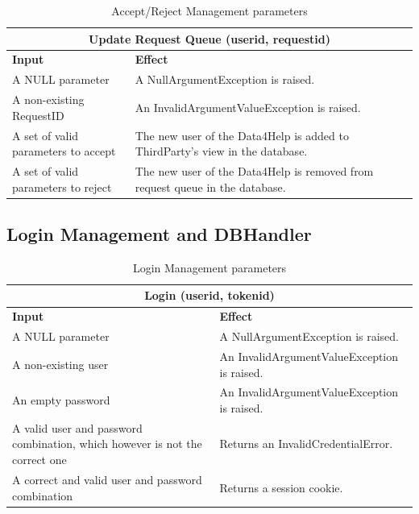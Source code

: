 \documentclass[a4paper, hidelinks, 12pt]{report}
\begin{document}
\begin{table}[H]
		\centering
		\begin{tabular}{|p{6cm}|p{9cm}|}
			\hline\hline
			\multicolumn{2}{c}{\textbf{Update Request Queue (userid, requestid)} }\\
			\hline
			\textbf{Input} & \textbf{Effect} \\ [0.5ex]
			\hline
			A NULL parameter & A NullArgumentException is raised.  \\
			\hline
			A non-existing RequestID & An InvalidArgumentValueException is raised.\\
			\hline
			A set of valid parameters to accept & The new user of the Data4Help is added to ThirdParty's view in the database.\\
			
			\hline
			A set of valid parameters to reject & The new user of the Data4Help is removed from request queue in the database.\\
			\hline
			
		\end{tabular}
		\caption{Accept/Reject Management parameters}
		\label{fig:Accept/Reject Management parameters}
	\end{table}
	
	\subsection{Login Management and DBHandler}
	\begin{table}[H]
		\centering
		\begin{tabular}{|p{6cm}|p{9cm}|}
			\hline\hline
			\multicolumn{2}{c}{\textbf{Login (userid, tokenid)} }\\
			\hline
			\textbf{Input} & \textbf{Effect} \\ [0.5ex]
			\hline
			A NULL parameter & A NullArgumentException is raised.  \\
			\hline
			A non-existing user & An InvalidArgumentValueException is raised.\\
			\hline
			An empty password & An InvalidArgumentValueException is raised.\\
			\hline
			A valid user and password
combination, which however is not the correct one & Returns an InvalidCredentialError.\\
\hline
			A correct and valid user and password combination & Returns a session cookie.\\
			\hline
			
		\end{tabular}
		\caption{Login Management parameters}
		\label{fig:Login Management parameters}
	\end{table}
	
\end{document}
